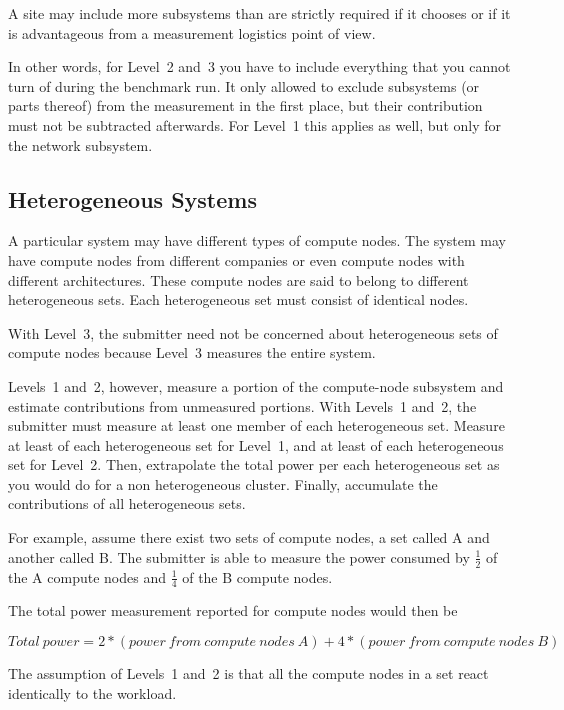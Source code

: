 \noindent
A site may include more subsystems than are strictly required if it chooses or if it is advantageous from a measurement logistics point of view.
\wl

\noindent
In other words, for Level~2 and~3 you have to include everything that you cannot turn of during the benchmark run.
It only allowed to exclude subsystems (or parts thereof) from the measurement in the first place, but their contribution must not be subtracted afterwards.
For Level~1 this applies as well, but only for the network subsystem.
\wl

\subsection{Heterogeneous Systems}

\noindent
A particular system may have different types of compute nodes.
The system may have compute nodes from different companies or even compute nodes with different architectures.
These compute nodes are said to belong to different heterogeneous sets.
Each heterogeneous set must consist of identical nodes.
\wl

\noindent
With Level~3, the submitter need not be concerned about heterogeneous sets of compute nodes because Level~3 measures the entire system.
\wl

\noindent
Levels~1 and~2, however, measure a portion of the compute-node subsystem and estimate contributions from unmeasured portions.
With Levels~1 and~2, the submitter must measure at least one member of each heterogeneous set.
Measure at least \SpecFracMinLOne{} of each heterogeneous set for Level~1, and at least \SpecFracMinLTwo{} of each heterogeneous set for Level~2.
Then, extrapolate the total power per each heterogeneous set as you would do for a non heterogeneous cluster.
Finally, accumulate the contributions of all heterogeneous sets.
\wl

\noindent
For example, assume there exist two sets of compute nodes, a set called A and another called B.
The submitter is able to measure the power 
consumed by $ \frac{1}{2} $ of the A compute nodes and $\frac{1}{4}$ of the B compute nodes.
\wl

\noindent
The total power measurement reported for compute nodes would then be 

\noindent
\[ Total~power=2*(power~from~compute~nodes~A) + 4*(power~from~compute~nodes~B) \]

\noindent
The assumption of Levels~1 and~2 is that all the compute nodes in a set react identically to the workload.


